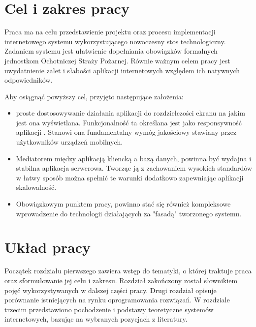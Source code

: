\section{Cel i zakres pracy}

Praca ma na celu przedstawienie projektu oraz procesu implementacji internetowego systemu wykorzystującego nowoczesny stos technologiczny. Zadaniem systemu jest ułatwienie dopełniania obowiązków formalnych jednostkom Ochotniczej Straży Pożarnej. Równie ważnym celem pracy jest uwydatnienie zalet i słabości aplikacji internetowych względem ich natywnych odpowiedników.

Aby osiągnąć powyższy cel, przyjęto następujące założenia:

\begin{itemize}
    \item proste dostosowywanie działania aplikacji do rozdzielczości ekranu na jakim jest ona wyświetlana. Funkcjonalność ta określana jest jako responsywność aplikacji \cite{Raducha.responsywne-strony-internetowe}. Stanowi ona fundamentalny wymóg jakościowy stawiany przez użytkowników urządzeń mobilnych.
    \item Mediatorem między aplikacją kliencką a bazą danych, powinna być wydajna i stabilna aplikacja serwerowa. Tworząc ją z zachowaniem wysokich standardów w łatwy sposób można spełnić te warunki dodatkowo zapewniając aplikacji skalowalność.
    \item Obowiązkowym punktem pracy, powinno stać się również kompleksowe wprowadzenie do technologii działających za "fasadą" tworzonego systemu. 
\end{itemize}

\section{Układ pracy}

Początek rozdziału pierwszego zawiera wstęp do tematyki, o której traktuje praca oraz sformułowanie jej celu i zakresu. Rozdział zakończony został słownikiem pojęć  wykorzystywanych w dalszej części pracy. Drugi rozdział opisuje porównanie istniejących na rynku oprogramowania rozwiązań. W rozdziale trzecim przedstawiono pochodzenie i podstawy teoretyczne systemów internetowych, bazując na wybranych pozycjach z literatury.

